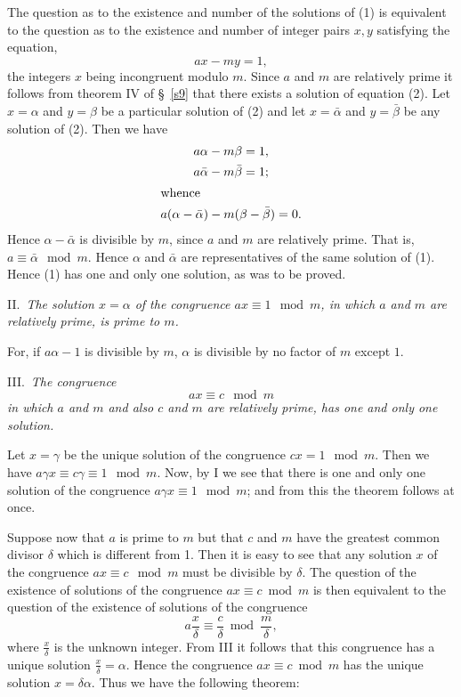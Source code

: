 \documentclass[oneside]{book}
\begin{document}
The question as to the existence and number of the solutions of (1)
is equivalent to the question as to the existence and number of
integer pairs $x, y$ satisfying the equation,
\begin{equation}
ax - my = 1, \tag{2}
\end{equation}
the integers $x$ being incongruent modulo $m$. Since $a$ and $m$ are
relatively prime it follows from theorem IV of \S~\ref{s9} that
there exists a solution of equation (2). Let $x = \alpha$ and $y =
\beta$ be a particular solution of (2) and let $x = \bar{\alpha}$
and $y = \bar{\beta}$ be any solution of (2). Then we have
\begin{gather*}
a\alpha-m\beta = 1, \\
a \bar{\alpha} - m\bar{\beta} = 1; \\
\intertext{whence}
a(\alpha - \bar{\alpha}) - m(\beta - \bar{\beta}) = 0.
\end{gather*}
Hence $\alpha-\bar{\alpha}$ is divisible by $m$, since $a$ and $m$
are relatively prime. That is, $a \equiv \bar{\alpha} \mod m$. Hence
$\alpha$ and $\bar{\alpha}$ are representatives of the same solution
of (1). Hence (1) has one and only one solution, as was to be
proved.

\smallskip II.~\emph{The solution $x = \alpha$ of the congruence
$ax \equiv 1 \mod m$, in which $a$ and $m$ are relatively prime, is
prime to $m$.}

For, if $a\alpha - 1$ is divisible by $m$, $\alpha$ is divisible by
no factor of $m$ except $1$.

\smallskip III.~\emph{The congruence}
\begin{equation}
ax \equiv c \mod m \tag{3}
\end{equation}
\emph{in which $a$ and $m$ and also $c$ and $m$ are relatively
prime, has one and only one solution.}

Let $x = \gamma$ be the unique solution of the congruence $cx = 1
\mod m$. Then we have $a\gamma x \equiv c\gamma \equiv 1 \mod m$.
Now, by I we see that there is one and only one solution of the
congruence $a\gamma x \equiv 1 \mod m$; and from this the theorem
follows at once.

Suppose now that $a$ is prime to $m$ but that $c$ and $m$ have the
greatest common divisor $\delta$ which is different from 1. Then it
is easy to see that any solution $x$ of the congruence $ax \equiv c
\mod m$ must be divisible by $\delta$. The question of the existence
of solutions of the congruence $ax \equiv c \bmod m$ is then
equivalent to the question of the existence of solutions of the
congruence
\begin{equation*}
a \frac{x}{\delta} \equiv \frac{c}{\delta} \bmod \frac{m}{\delta},
\end{equation*}
where $\frac{x}{\delta}$ is the unknown integer. From III it follows
that this congruence has a unique solution $\frac{x}{\delta} =
\alpha$. Hence the congruence $ax \equiv c \bmod m$ has the unique
solution $x = \delta\alpha$. Thus we have the following theorem:
\end{document}
